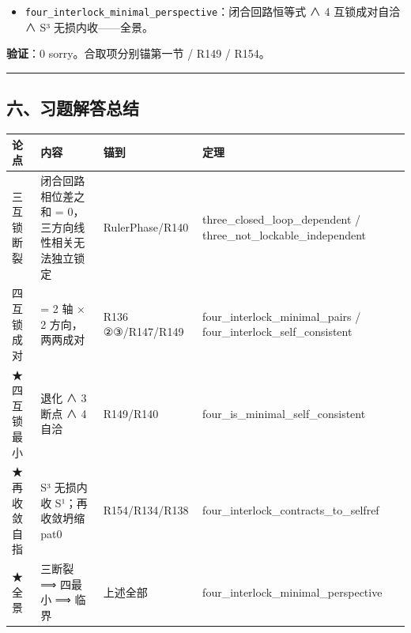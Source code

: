 \documentclass[
]{article}
\newcounter{none} %
\providecommand{\tightlist}{%
 \setlength{\itemsep}{0pt}\setlength{\parskip}{0pt}}
\begin{document}
\begin{itemize}
\tightlist
\item
 \texttt{four\_interlock\_minimal\_perspective}：闭合回路恒等式 ∧ 4
 互锁成对自洽 ∧ S³ 无损内收------全景。
\end{itemize}

\textbf{验证}：0 sorry。合取项分别锚第一节 / R149 / R154。

\begin{center}\rule{0.5\linewidth}{0.5pt}\end{center}

\subsection{六、习题解答总结}\label{ux516dux4e60ux9898ux89e3ux7b54ux603bux7ed3}

{\def\LTcaptype{none} %
\begin{longtable}[]{@{}
 >{\raggedright\arraybackslash}p{}
 >{\raggedright\arraybackslash}p{}
 >{\raggedright\arraybackslash}p{}
 >{\raggedright\arraybackslash}p{}@{}}
\toprule\noalign{}
\begin{minipage}[b]{\linewidth}\raggedright
论点
\end{minipage} & \begin{minipage}[b]{\linewidth}\raggedright
内容
\end{minipage} & \begin{minipage}[b]{\linewidth}\raggedright
锚到
\end{minipage} & \begin{minipage}[b]{\linewidth}\raggedright
定理
\end{minipage} \\
\midrule\noalign{}
\endhead
\bottomrule\noalign{}
\endlastfoot
三互锁断裂 & 闭合回路相位差之和 = 0，三方向线性相关无法独立锁定 &
RulerPhase/R140 & three\_closed\_loop\_dependent /
three\_not\_lockable\_independent \\
四互锁成对 & 4 = 2 轴 × 2 方向，两两成对 & R136 ②③/R147/R149 &
four\_interlock\_minimal\_pairs / four\_interlock\_self\_consistent \\
★四互锁最小 & 1 退化 ∧ 3 断点 ∧ 4 自洽 & R149/R140 &
four\_is\_minimal\_self\_consistent \\
★再收敛自指 & S³ 无损内收 S¹；再收敛坍缩 pat0 & R154/R134/R138 &
four\_interlock\_contracts\_to\_selfref \\
★全景 & 三断裂 ⟹ 四最小 ⟹ 临界 & 上述全部 &
four\_interlock\_minimal\_perspective \\
\end{longtable}
}
\end{document}
